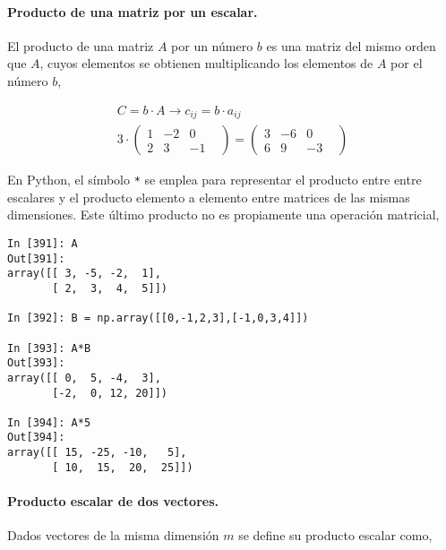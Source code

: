 \begin{paracol}{2}
\paragraph{Producto de una matriz por un escalar.} El producto de una matriz $A$ por un número $b$ es una matriz del mismo orden que $A$, cuyos elementos se obtienen multiplicando los elementos de $A$ por el número $b$,
\end{paracol}
\begin{gather*}
C=b\cdot A \rightarrow c_{ij}=b\cdot a_{ij}\\
3\cdot
\begin{pmatrix}
1& -2& 0\\
2& 3& -1&
\end{pmatrix}=
\begin{pmatrix}
3& -6& 0\\
6& 9& -3&
\end{pmatrix} 
\end{gather*}

\begin{paracol}{2}
En Python, el símbolo \texttt{*} se emplea para representar el producto entre entre escalares y el producto elemento a elemento entre matrices de las mismas dimensiones. Este último producto no es propiamente una operación matricial,
\end{paracol}

\begin{center}
    \begin{minipage}{0.5\textwidth}
        \begin{verbatim}
In [391]: A
Out[391]: 
array([[ 3, -5, -2,  1],
       [ 2,  3,  4,  5]])

In [392]: B = np.array([[0,-1,2,3],[-1,0,3,4]])

In [393]: A*B
Out[393]: 
array([[ 0,  5, -4,  3],
       [-2,  0, 12, 20]])

In [394]: A*5
Out[394]: 
array([[ 15, -25, -10,   5],
       [ 10,  15,  20,  25]])
        \end{verbatim}
    \end{minipage}
\end{center}

\begin{paracol}{2}
\paragraph{Producto escalar de dos vectores.} Dados vectores de la misma dimensión $m$ se define su producto escalar como,     
\end{paracol}


